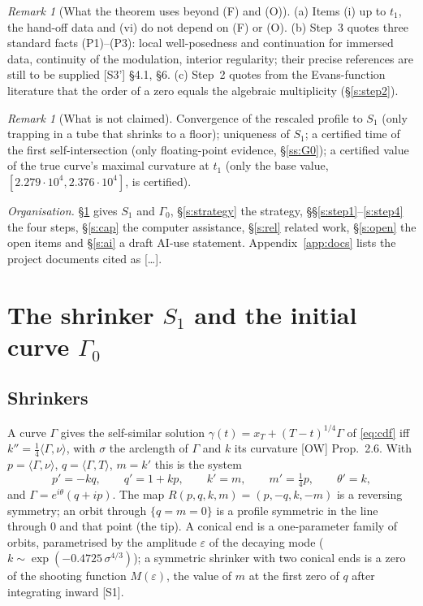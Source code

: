 \documentclass[11pt]{amsart}
\theoremstyle{definition}
\theoremstyle{remark}
\newtheorem{remark}[theorem]{Remark}
\newcommand{\eps}{\varepsilon}
\newcommand{\ip}[2]{\langle #1,#2\rangle}
\newcommand{\dref}[1]{[\textsf{#1}]}
\begin{document}
\begin{remark}[What the theorem uses beyond (F) and (O)]\label{rem:uses}
(a) Items (i) up to $t_1$, the hand-off data and (vi) do not depend on (F) or (O). (b) Step~3 quotes three standard facts (P1)--(P3): local well-posedness and continuation for immersed data, continuity of the modulation, interior regularity; their precise references are still to be supplied \dref{S3'} \S4.1, \S6. (c) Step~2 quotes from the Evans-function literature that the order of a zero equals the algebraic multiplicity \cite{AlexanderGardnerJones1990,KapitulaPromislow2013,LatushkinSukhtayev2010} (\S\ref{s:step2}).
\end{remark}

\begin{remark}[What is not claimed]
Convergence of the rescaled profile to $S_1$ (only trapping in a tube that shrinks to a floor); uniqueness of $S_1$; a certified time of the first self-intersection (only floating-point evidence, \S\ref{ss:G0}); a certified value of the true curve's maximal curvature at $t_1$ (only the base value, $[2.279\cdot10^4,2.376\cdot10^4]$, is certified).
\end{remark}

\noindent\emph{Organisation.} \S\ref{s:data} gives $S_1$ and $\Gamma_0$, \S\ref{s:strategy} the strategy, \S\S\ref{s:step1}--\ref{s:step4} the four steps, \S\ref{s:cap} the computer assistance, \S\ref{s:rel} related work, \S\ref{s:open} the open items and \S\ref{s:ai} a draft AI-use statement. Appendix~\ref{app:docs} lists the project documents cited as \dref{\dots}.

\section{The shrinker \texorpdfstring{$S_1$}{S1} and the initial curve \texorpdfstring{$\Gamma_0$}{Gamma0}}\label{s:data}

\subsection{Shrinkers}
A curve $\Gamma$ gives the self-similar solution $\gamma(t)=x_T+(T-t)^{1/4}\Gamma$ of \eqref{eq:cdf} iff $k''=\frac14\ip{\Gamma}{\nu}$, with $\sigma$ the arclength of $\Gamma$ and $k$ its curvature \dref{OW} Prop.~2.6. With $p=\ip\Gamma\nu$, $q=\ip\Gamma T$, $m=k'$ this is the system
\begin{equation}\label{eq:prof}
p'=-kq,\qquad q'=1+kp,\qquad k'=m,\qquad m'=\tfrac14p,\qquad\theta'=k,
\end{equation}
and $\Gamma=e^{i\theta}(q+ip)$. The map $R(p,q,k,m)=(p,-q,k,-m)$ is a reversing symmetry; an orbit through $\{q=m=0\}$ is a profile symmetric in the line through $0$ and that point (the tip). A conical end is a one-parameter family of orbits, parametrised by the amplitude $\eps$ of the decaying mode ($k\sim\exp(-0.4725\,\sigma^{4/3})$); a symmetric shrinker with two conical ends is a zero of the shooting function $M(\eps)$, the value of $m$ at the first zero of $q$ after integrating inward \dref{S1}.
\end{document}
